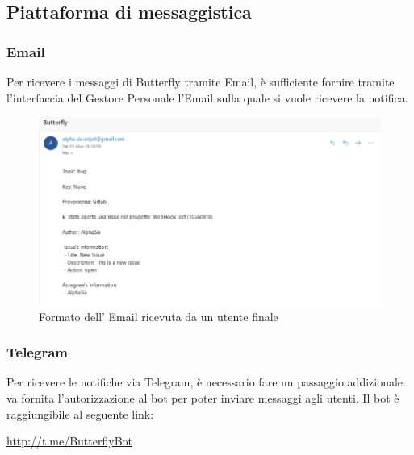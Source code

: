 \subsection{Piattaforma di messaggistica}

\subsubsection{Email}

Per ricevere i messaggi di Butterfly tramite Email, è sufficiente fornire tramite l'interfaccia del Gestore Personale l'Email sulla quale si vuole ricevere la notifica.

\begin{figure}[H]
	\centering
	\includegraphics[width=\textwidth]{img/notifica_email_1.png}
	\caption{Formato dell' Email ricevuta da un utente finale}
\end{figure}

\subsubsection{Telegram}

Per ricevere le notifiche via Telegram, è necessario fare un passaggio addizionale: va fornita l'autorizzazione al bot per poter inviare messaggi agli utenti.
Il bot è raggiungibile al seguente link:
\begin{center}
    \url{http://t.me/ButterflyBot}
\end{center}

